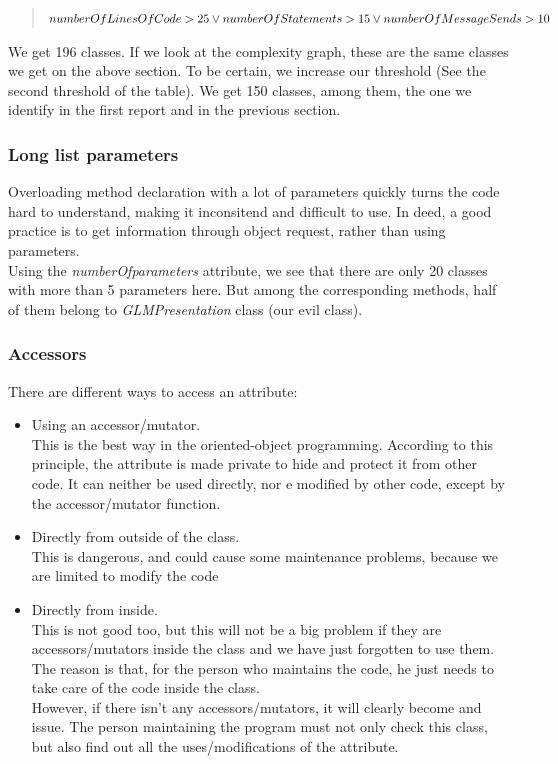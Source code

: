 \documentclass[11pt,a4paper]{article}
\begin{document}
\begin{quote} $ numberOfLinesOfCode > 25 \\ \vee numberOfStatements > 15 \\ \vee numberOfMessageSends > 10$\\\end{quote}

We get 196 classes. If we look at the complexity graph, these are the same classes we get on the above section. To be certain, we increase our threshold (See the second threshold of the table). We get 150 classes, among them, the one we identify in the first report and in the previous section.
\subsubsection{Long list parameters}
Overloading method declaration with a lot of parameters quickly turns the code hard to understand, making it inconsitend and difficult to use. In deed, a good practice is to get information through object request, rather than using parameters.\\

Using the \textit{numberOfparameters} attribute,  we see that there are only 20 classes with more than 5 parameters here. But among the corresponding methods, half of them belong to \textit{GLMPresentation} class (our evil class).
\subsubsection{Accessors}
There are different ways to access an attribute:
\begin{itemize}
\item Using an accessor/mutator.\\ This is the best way in the oriented-object programming. According to this principle, the attribute is made private to hide and protect it from other code. It can neither be used directly, nor e modified by other code, except by the accessor/mutator function.
\item Directly from outside of the class. \\ This is dangerous, and could cause some maintenance problems, because we are limited to modify the code
\item Directly from inside. \\ This is not good too, but this will not be a big problem if they are accessors/mutators inside the class and we have just forgotten to use them. The reason is that, for the person who maintains the code, he just needs to take care of the code inside the class.\\ However, if there isn't any accessors/mutators, it will clearly become and issue. The person maintaining the program must not only check this class, but also find out all the uses/modifications of the attribute.
\end{itemize}
\end{document}
